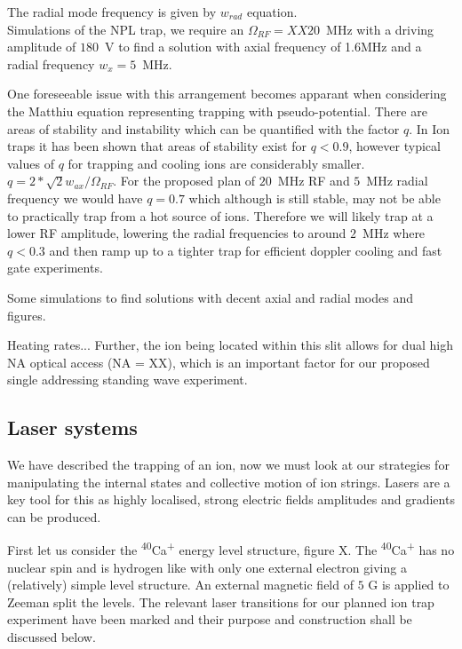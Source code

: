 \documentclass[12pt]{iopart}
\begin{document}
The radial mode frequency is given by
$w_{rad}$ equation. \\
Simulations of the NPL trap,
we require an $\Omega_{RF} = XX20$~MHz with a driving amplitude of
$180$~V to find a solution with axial frequency of 1.6MHz and a radial
frequency $w_x = 5$~MHz.

One foreseeable issue with this arrangement becomes apparant when
considering the Matthiu equation representing trapping with
pseudo-potential. There are areas of stability and instability which
can be quantified with the factor $q$. In Ion traps it has been shown
that areas of stability exist for $q<0.9$, however typical values of
$q$ for trapping and cooling ions are considerably smaller.
$q = 2*\sqrt{2}w_{ax}/\Omega_{RF}$.
For the proposed plan of $20$~MHz RF and $5$~MHz radial frequency we
would have $q = 0.7$ which although is still stable, may not be able
to practically trap from a hot source of ions. Therefore we will
likely trap at a lower RF amplitude, lowering the radial frequencies
to around $2$~MHz where $q<0.3$ and then ramp up to a tighter trap for
efficient doppler cooling and fast gate experiments.

Some simulations to find solutions with decent axial and radial modes and figures.

Heating rates... Further, the ion being located within this
slit allows for dual high NA optical access (NA = XX), which is an
important factor for our proposed single addressing standing wave
experiment.

\subsection{Laser systems}

We have described the trapping of an ion, now we must look at our
strategies for manipulating the internal states and collective motion
of ion strings. Lasers are a key tool for this as highly localised,
strong electric fields amplitudes and gradients can be produced.

First let us consider the \textsuperscript{40}Ca\textsuperscript{+} energy
level structure, figure X. The \textsuperscript{40}Ca\textsuperscript{+} has
no nuclear spin and is hydrogen like with only one external electron
giving a (relatively) simple level structure. An external magnetic
field of $5$ G is applied to Zeeman split the levels. The relevant
laser transitions for our planned ion trap experiment have been marked
and their purpose and construction shall be discussed below.\\
\end{document}
